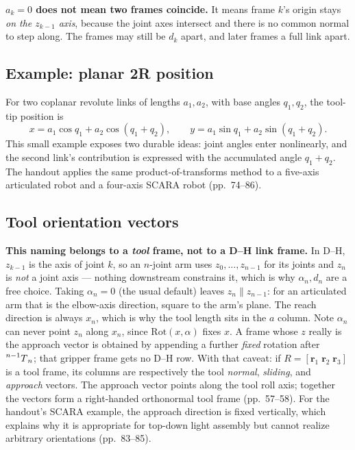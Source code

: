 \documentclass[11pt,a4paper]{article}
\begin{document}
\textbf{$a_k=0$ does not mean two frames coincide.} It means frame $k$'s origin stays \emph{on the
$z_{k-1}$ axis}, because the joint axes intersect and there is no common normal to step along. The
frames may still be $d_k$ apart, and later frames a full link apart.

\subsection{Example: planar 2R position}

For two coplanar revolute links of lengths $a_1,a_2$, with base angles $q_1,q_2$, the tool-tip position is
\[
  x=a_1\cos q_1+a_2\cos(q_1+q_2),\qquad
  y=a_1\sin q_1+a_2\sin(q_1+q_2).
\]
This small example exposes two durable ideas: joint angles enter nonlinearly, and the second link's contribution is expressed with the accumulated angle $q_1+q_2$. The handout applies the same product-of-transforms method to a five-axis articulated robot and a four-axis SCARA robot (pp.~74--86).

\subsection{Tool orientation vectors}


\textbf{This naming belongs to a \emph{tool} frame, not to a D--H link frame.} In D--H, $z_{k-1}$ is the axis of joint $k$, so an $n$-joint arm uses $z_0,\ldots,z_{n-1}$ for its joints and $z_n$ is \emph{not} a joint axis --- nothing downstream constrains it, which is why $\alpha_n,d_n$ are a free choice. Taking $\alpha_n=0$ (the usual default) leaves $z_n\parallel z_{n-1}$: for an articulated arm that is the elbow-axis direction, square to the arm's plane. The reach direction is always $x_n$, which is why the tool length sits in the $a$ column. Note $\alpha_n$ can never point $z_n$ along $x_n$, since $\mathrm{Rot}(x,\alpha)$ fixes $x$. A frame whose $z$ really is the approach vector is obtained by appending a further \emph{fixed} rotation after $\prescript{n-1}{}{T}_{n}$; that gripper frame gets no D--H row. With that caveat: if $R=[\mathbf r_1\;\mathbf r_2\;\mathbf r_3]$ is a tool frame, its columns are respectively the tool \emph{normal}, \emph{sliding}, and \emph{approach} vectors. The approach vector points along the tool roll axis; together the vectors form a right-handed orthonormal tool frame (pp.~57--58). For the handout's SCARA example, the approach direction is fixed vertically, which explains why it is appropriate for top-down light assembly but cannot realize arbitrary orientations (pp.~83--85).
\end{document}
